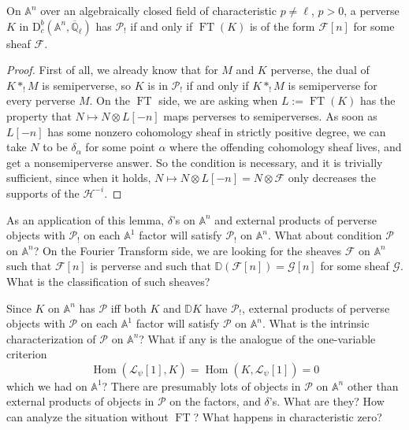 On \(\mathbb{A}^n\) over an algebraically closed field of characteristic
\(p\ne\ell\), \(p>0\), a perverse \(K\) in
\(\mathrm{D}^b_c(\mathbb{A}^n,\overline{\mathbb{Q}}_\ell)\) has
\(\mathcal{P}_!\) if and only if \(\operatorname{FT}(K)\) is of the form
\(\mathcal{F}[n]\) for some sheaf \(\mathcal{F}\).
\begin{proof}
First of all, we already know that for \(M\) and \(K\) perverse, the dual of
\(K*_!M\) is semiperverse, so \(K\) is in \(\mathcal{P}_!\) if and only if
\(K*_!M\) is semiperverse for every perverse \(M\). On the
\(\operatorname{FT}\) side, we are asking when \(L:=\operatorname{FT}(K)\) has
the property that \(N\mapsto N\otimes L[-n]\) maps perverses to
semiperverses. As soon as \(L[-n]\) has some nonzero cohomology sheaf in
strictly positive degree, we can take \(N\) to be \(\delta_\alpha\) for some
point \(\alpha\) where the offending cohomology sheaf lives, and get a
nonsemiperverse answer. So the condition is necessary, and it is trivially
sufficient, since when it holds,
\(N\mapsto N\otimes L[-n]=N\otimes\mathcal{F}\) only decreases the supports of
the \(\mathcal{H}^{-i}\).
\end{proof}

As an application of this lemma, \(\delta\)'s on \(\mathbb{A}^n\) and external
products of perverse objects with \(\mathcal{P}_!\) on each \(\mathbb{A}^1\)
factor will satisfy \(\mathcal{P}_!\) on \(\mathbb{A}^n\). What about condition
\(\mathcal{P}\) on \(\mathbb{A}^n\)? On the Fourier Transform side, we are
looking for the sheaves \(\mathcal{F}\) on \(\mathbb{A}^n\) such that
\(\mathcal{F}[n]\) is perverse and such that
\(\mathbb{D}(\mathcal{F}[n])=\mathcal{G}[n]\) for some sheaf \(\mathcal{G}\).
What is the classification of such sheaves?

Since \(K\) on \(\mathbb{A}^n\) has \(\mathcal{P}\) iff both \(K\) and
\(\mathbb{D}K\) have \(\mathcal{P}_!\), external products of perverse objects
with \(\mathcal{P}\) on each \(\mathbb{A}^1\) factor will satisfy
\(\mathcal{P}\) on \(\mathbb{A}^n\). What is the intrinsic characterization of
\(\mathcal{P}\) on \(\mathbb{A}^n\)? What if any is the analogue of the
one-variable criterion
\[
  \operatorname{Hom}(\mathcal{L}_\psi[1],K)
  =
  \operatorname{Hom}(K,\mathcal{L}_\psi[1])=0
\]
which we had on \(\mathbb{A}^1\)? There are presumably lots of objects in
\(\mathcal{P}\) on \(\mathbb{A}^n\) other than external products of objects in
\(\mathcal{P}\) on the factors, and \(\delta\)'s. What are they? How can
analyze the situation without \(\operatorname{FT}\)? What happens in
characteristic zero?

